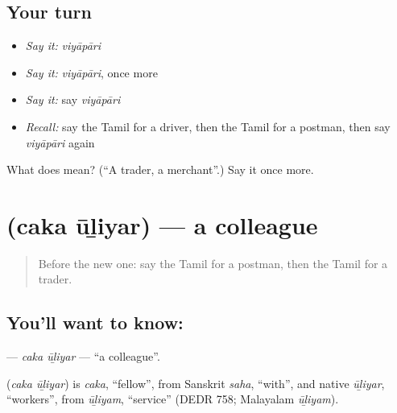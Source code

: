 \subsection*{Your turn}
\begin{itemize}
\raggedright
  \item \emph{Say it:} \emph{viyāpāri}
  \item \emph{Say it:} \emph{viyāpāri}, once more
  \item \emph{Say it:} say \emph{viyāpāri}
  \item \emph{Recall:} say the Tamil for a driver, then the Tamil for a postman, then say \emph{viyāpāri} again
\end{itemize}

\begin{tcolorbox}[breakable,colback=teal!4,colframe=teal!35!black,title={Before you move on}]
What does  mean? (\textquotedblleft{}A trader, a merchant\textquotedblright{}.) Say it once more.
\end{tcolorbox}
\section[\texorpdfstring{\ta{சக} \ta{ஊழியர்} (caka ūḻiyar)}{சக ஊழியர் (caka ūḻiyar)}]{  (caka ūḻiyar) — a colleague}

\label{lesson:TA-C192-caka-uliyar}



\begin{quote}
Before the new one: say the Tamil for a postman, then the Tamil for a trader.
\end{quote}

\subsection*{You'll want to know:  }
\textbf{ } — \emph{caka ūḻiyar} — \textquotedblleft{}a colleague\textquotedblright{}.

\begin{cousinweb}
\textbf{ } (\emph{caka ūḻiyar}) is \emph{caka}, \textquotedblleft{}fellow\textquotedblright{}, from Sanskrit \emph{saha}, \textquotedblleft{}with\textquotedblright{}, and native \emph{ūḻiyar}, \textquotedblleft{}workers\textquotedblright{}, from \emph{ūḻiyam}, \textquotedblleft{}service\textquotedblright{} (DEDR 758; Malayalam \emph{ūḻiyam}).
\end{cousinweb}

